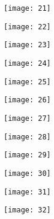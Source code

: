 \newpage
\begin{figure}[H]
	\centering
	\texttt{[image: 21]}
\end{figure}

\newpage
\begin{figure}[H]
	\centering
	\texttt{[image: 22]}
\end{figure}

\begin{figure}[H]
	\centering
	\texttt{[image: 23]}
\end{figure}

\begin{figure}[H]
	\centering
	\texttt{[image: 24]}
\end{figure}

\begin{figure}[H]
	\centering
	\texttt{[image: 25]}
\end{figure}

\newpage
\begin{figure}[H]
	\centering
	\texttt{[image: 26]}
\end{figure}

\begin{figure}[H]
	\centering
	\texttt{[image: 27]}
\end{figure}

\begin{figure}[H]
	\centering
	\texttt{[image: 28]}
\end{figure}

\newpage
\begin{figure}[H]
	\centering
	\texttt{[image: 29]}
\end{figure}

\begin{figure}[H]
	\centering
	\texttt{[image: 30]}
\end{figure}


\begin{figure}[H]
	\centering
	\texttt{[image: 31]}
\end{figure}


\newpage
\begin{figure}[H]
	\centering
	\texttt{[image: 32]}
\end{figure}

